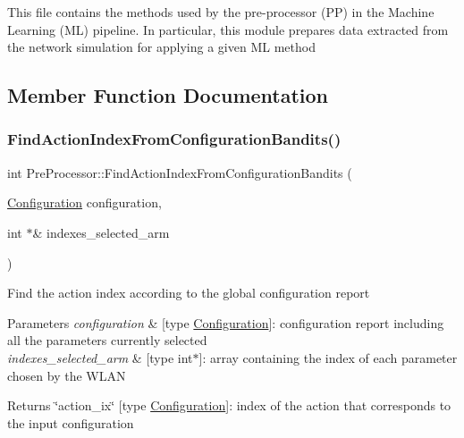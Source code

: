 \begin{DoxyItemize}
\item This file contains the methods used by the pre-\/processor (PP) in the Machine Learning (ML) pipeline. In particular, this module prepares data extracted from the network simulation for applying a given ML method 
\end{DoxyItemize}

\subsection{Member Function Documentation}
\mbox{\label{classPreProcessor_a484b126cf65d3a2afda4eb0770276c5b}} 
\subsubsection{\texorpdfstring{Find\+Action\+Index\+From\+Configuration\+Bandits()}{FindActionIndexFromConfigurationBandits()}}
{\footnotesize\ttfamily int Pre\+Processor\+::\+Find\+Action\+Index\+From\+Configuration\+Bandits (\begin{DoxyParamCaption}\item[{\hyperlink{structConfiguration}{Configuration}}]{configuration,  }\item[{int $\ast$\&}]{indexes\+\_\+selected\+\_\+arm }\end{DoxyParamCaption})\hspace{0.3cm}{\ttfamily [inline]}}

Find the action index according to the global configuration report 
\begin{DoxyParams}{Parameters}
{\em configuration} & \mbox{[}type \hyperlink{structConfiguration}{Configuration}\mbox{]}\+: configuration report including all the parameters currently selected \\
\hline
{\em indexes\+\_\+selected\+\_\+arm} & \mbox{[}type int$\ast$\mbox{]}\+: array containing the index of each parameter chosen by the W\+L\+AN \\
\hline
\end{DoxyParams}
\begin{DoxyReturn}{Returns}
\char`\"{}action\+\_\+ix\char`\"{} \mbox{[}type \hyperlink{structConfiguration}{Configuration}\mbox{]}\+: index of the action that corresponds to the input configuration 
\end{DoxyReturn}
\mbox{\label{classPreProcessor_a1314ba4c5f3e17cdcf2f11d49f40c148}} 

